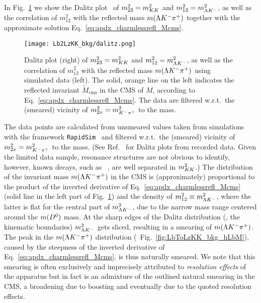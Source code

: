 In Fig.~\ref{fig:apdx_charmlessrefl_dalitz} we show the Dalitz plot~\cite{dalitz1,dalitz2} of $m^2_{23} = m^2_{{K}{K}}$ and $m^2_{12} = m^2_{{\Lambda}{{K}^-}}$, as well as the correlation of $m^2_{12}$ with the reflected mass $m({\Lambda}{{K}^-}{{\pi}^+})$ together with the approximate solution Eq.~\eqref{eq:apdx_charmlessrefl_Mcms}.
\begin{figure}[htbp]
    \centering
    \texttt{[image: Lb2LzKK\_bkg/dalitz.png]}
    \caption{Dalitz plot (right) of $m^2_{23} = m^2_{{K}{K}}$ and $m^2_{12} = m^2_{{\Lambda}{{K}^-}}$, as well as the correlation of $m^2_{12}$ with the reflected mass $m({\Lambda}{{K}^-}{{\pi}^+})$ using simulated data (left). The solid, orange line on the left indicates the reflected invariant $\tilde M_\text{cms}$ in the CMS of $M$, according to Eq.~\eqref{eq:apdx_charmlessrefl_Mcms}. The data are filtered w.r.t.\ the (smeared) vicinity of $m_{2x}^2=m^2_{{{K}^-}{{\pi}^+}}$ to the \Dz mass.}
    \label{fig:apdx_charmlessrefl_dalitz}
\end{figure}
The data points are calculated from unsmeared values taken from simulations with the framework \texttt{RapidSim}~\cite{rapidsim} and filtered w.r.t.\ the (smeared) vicinity of $m_{2x}^2=m^2_{{{K}^-}{{\pi}^+}}$ to the \Dz mass.
(See Ref.~\cite{LbToLzhh} for Dalitz plots from recorded data. Given the limited data sample, resonance structures are not obvious to identify, however, known \Lb decays, such as \decay{\Lb}{\Lz\Pphi}~\cite{LbToLzphi}, are well separated in $m^2_{{K}{K}}$.)
The distribution of the invariant mass $m({\Lambda}{{K}^-}{{\pi}^+})$ in the CMS is (approximately) proportional to the product of the inverted derivative of Eq.~\eqref{eq:apdx_charmlessrefl_Mcms} (solid line in the left part of Fig.~\ref{fig:apdx_charmlessrefl_dalitz}) and the density of $m^2_{12} \equiv m^2_{{\Lambda}{{K}^-}}$, where the latter is flat for the central part of $m^2_{{\Lambda}{{K}^-}}$, due to the narrow mass range centered around the $m({{D}^0})$ mass.
At the sharp edges of the Dalitz distribution (\ie{}, the kinematic boundaries) $m^2_{{\Lambda}{{K}^-}}$ gets sliced, resulting in a smearing of $m({\Lambda}{{K}^-}{{\pi}^+})$.
The peak in the $m({\Lambda}{{K}^-}{{\pi}^+})$ distribution (\cf{}~Fig.~\ref{fig:LbToLzKK_bkg_hLbM}), caused by the steepness of the inverted derivative of Eq.~\eqref{eq:apdx_charmlessrefl_Mcms}, is thus naturally smeared.
We note that this smearing is often exclusively and imprecisely attributed to \textit{resolution effects} of the apparatus but in fact is an admixture of the outlined natural smearing in the CMS, a broadening due to boosting and eventually due to the quoted resolution effects.

